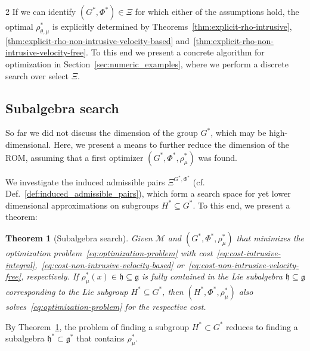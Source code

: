 \documentclass{article}
\newtheorem{theorem}{Theorem}[section]
\newcommand{\M}{\mathcal{M}}                                %
\newcommand{\g}{\mathfrak{g}}                               %
\newcommand{\state}{x}
\newcommand{\appstate}{\bar{x}}
\begin{document}
\begin{multicols}{2}
If we can identify $(G^*,\Phi^*)\in \Xi$ for which either of the assumptions hold, the optimal $\rho^*_{\theta,\mu}$ is explicitly determined by Theorems~\ref{thm:explicit-rho-intrusive},\ref{thm:explicit-rho-non-intrusive-velocity-based} and~\ref{thm:explicit-rho-non-intrusive-velocity-free}. To this end we present a concrete algorithm for optimization in Section~\ref{sec:numeric_examples}, where we perform a discrete search over select $\Xi$.

\subsection{Subalgebra search}\label{ssec:subalgebra-search}
So far we did not discuss the dimension of the group $G^*$, which may be high-dimensional. Here, we present a means to further reduce the dimension of the ROM, assuming that a first optimizer $(G^*,\Phi^*,\rho_\mu^*)$ was found. 

We investigate the induced admissible pairs $\Xi^{G^*,\Phi^*}$ (cf. Def.~\ref{def:induced_admissible_pairs}), which form a search space for yet lower dimensional approximations on subgroups $H^*\subseteq G^*$. To this end, we present a theorem:
\begin{theorem}[Subalgebra search]\label{thm:subalgebra-search}
    Given $\M$ and $(G^*,\Phi^*,\rho_\mu^*)$ that minimizes the optimization problem~\eqref{eq:optimization-problem} with cost~\eqref{eq:cost-intrusive-integral},~\eqref{eq:cost-non-intrusive-velocity-based} or~\eqref{eq:cost-non-intrusive-velocity-free}, respectively. If $\rho_{\mu}^*(\state) \in \mathfrak{h} \subseteq \g$ is fully contained in the Lie subalgebra $\mathfrak{h} \subseteq \g$ corresponding to the Lie subgroup $H^* \subseteq G^*$, then $(H^*,\Phi^*,\rho_\mu^*)$ also solves~\eqref{eq:optimization-problem} for the respective cost. 
\end{theorem}
By Theorem~\ref{thm:subalgebra-search}, %
the problem of finding a subgroup $H^*\subset G^*$ reduces to finding a subalgebra $\mathfrak{h}^*\subset\g^*$ that contains $\rho_\mu^*$. 


\end{multicols}
\end{document}
